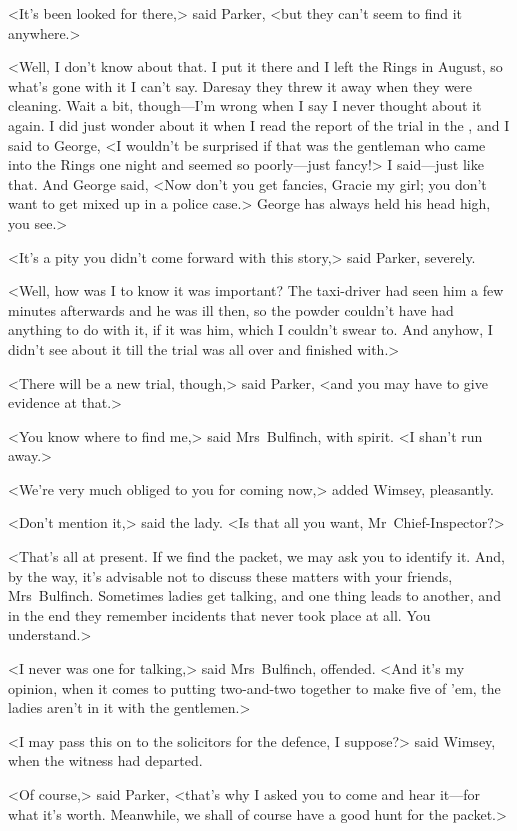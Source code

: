 <It's been looked for there,> said Parker, <but they can't seem to find it anywhere.>

<Well, I don't know about that. I put it there and I left the Rings in August, so what's gone with it I can't say. Daresay they threw it away when they were cleaning. Wait a bit, though—I'm wrong when I say I never thought about it again. I did just wonder about it when I read the report of the trial in the , and I said to George, <I wouldn't be surprised if that was the gentleman who came into the Rings one night and seemed so poorly—just fancy!> I said—just like that. And George said, <Now don't you get fancies, Gracie my girl; you don't want to get mixed up in a police case.> George has always held his head high, you see.>

<It's a pity you didn't come forward with this story,> said Parker, severely.

<Well, how was I to know it was important? The taxi-driver had seen him a few minutes afterwards and he was ill then, so the powder couldn't have had anything to do with it, if it was him, which I couldn't swear to. And anyhow, I didn't see about it till the trial was all over and finished with.>

<There will be a new trial, though,> said Parker, <and you may have to give evidence at that.>

<You know where to find me,> said Mrs~Bulfinch, with spirit. <I shan't run away.>

<We're very much obliged to you for coming now,> added Wimsey, pleasantly.

<Don't mention it,> said the lady. <Is that all you want, Mr~Chief-Inspector?>

<That's all at present. If we find the packet, we may ask you to identify it. And, by the way, it's advisable not to discuss these matters with your friends, Mrs~Bulfinch. Sometimes ladies get talking, and one thing leads to another, and in the end they remember incidents that never took place at all. You understand.>

<I never was one for talking,> said Mrs~Bulfinch, offended. <And it's my opinion, when it comes to putting two-and-two together to make five of 'em, the ladies aren't in it with the gentlemen.>

<I may pass this on to the solicitors for the defence, I suppose?> said Wimsey, when the witness had departed.

<Of course,> said Parker, <that's why I asked you to come and hear it—for what it's worth. Meanwhile, we shall of course have a good hunt for the packet.>


